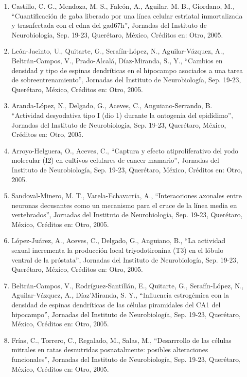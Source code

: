\begin{enumerate}
\item Castillo, C. G., Mendoza, M. S., Falcón, A., Aguilar, M. B., Giordano, M., “Cuantificación de gaba liberado por una 
línea celular estriatal inmortalizada y trasnfectada con el cdna del gad67h”, Jornadas del Instituto de Neurobiología, Sep. 
19-23, Querétaro, México, Créditos en: Otro, 2005.

\item León-Jacinto, U., Quitarte, G., Serafín-López, N., Aguilar-Vázquez, A., Beltrán-Campos, V., Prado-Alcalá, Díaz-Miranda, 
S., Y., “Cambios en densidad y tipo de espinas dendríticas en el hipocampo asociados a una tarea de sobreentrenamiento”, 
Jornadas del Instituto de Neurobiología, Sep. 19-23, Querétaro, México, Créditos en: Otro, 2005.

\item Aranda-López, N., Delgado, G., Aceves, C., Anguiano-Serrando, B. “Actividad desyodativa tipo I (dio 1) durante la 
ontogenia del epidídimo”, Jornadas del Instituto de Neurobiología, Sep. 19-23, Querétaro, México, Créditos en: Otro, 2005.

\item Arroyo-Helguera, O., Aceves, C., “Captura y efecto atiproliferativo del yodo molecular (I2) en cultivos celulares de 
cancer mamario”, Jornadas del Instituto de Neurobiología, Sep. 19-23, Querétaro, México, Créditos en: Otro, 2005.

\item Sandoval-Minero, M. T., Varela-Echavarría, A., “Interacciones axonales entre neuronas decusantes como un mecanismo para 
el cruce de la línea media en vertebrados”, Jornadas del Instituto de Neurobiología, Sep. 19-23, Querétaro, México, 
Créditos en: Otro, 2005.

\item López-Juárez, A., Aceves, C., Delgado, G., Anguiano, B., “La actividad sexual incrementa la producción local 
triyodotironina (T3) en el lóbulo ventral de la próstata”, Jornadas del Instituto de Neurobiología, Sep. 19-23, Querétaro, 
México, Créditos en: Otro, 2005.

\item Beltrán-Campos, V., Rodríguez-Santillán, E., Quitarte, G., Serafín-López, N., Aguilar-Vázquez, A., 
Díaz’Miranda, S. Y., “Influencia estrogémica con la densidad de espinas dendríticas de las células piramidales del CA1 del 
hipocampo”, Jornadas del Instituto de Neurobiología, Sep. 19-23, Querétaro, México, Créditos en: Otro, 2005.

\item Frías, C., Torrero, C., Regalado, M., Salas, M., “Desarrrollo de las células mitrales en ratas desnutridas 
posnatalmente: posibles alteraciones funcionales”, Jornadas del Instituto de Neurobiología, Sep. 19-23, Querétaro, México, 
Créditos en: Otro, 2005.


\end{enumerate}
